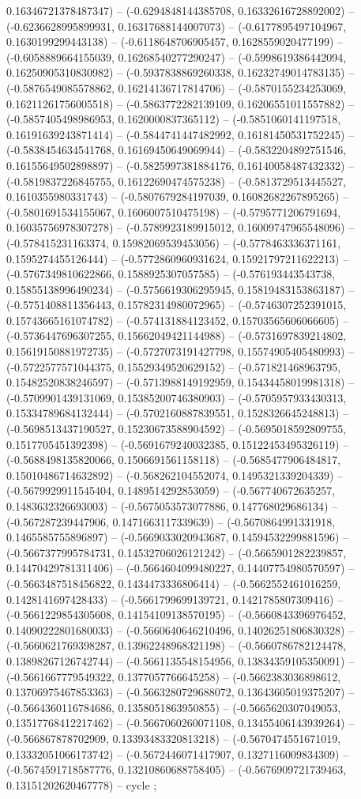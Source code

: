 0.16346721378487347) -- (-0.6294848144385708, 0.16332616728892002) -- (-0.6236628995899931, 0.16317688144007073) -- (-0.6177895497104967, 0.1630199299443138) -- (-0.6118648706905457, 0.1628559020477199) -- (-0.6058889664155039, 0.16268540277290247) -- (-0.5998619386442094, 0.16250905310830982) -- (-0.5937838869260338, 0.16232749014783135) -- (-0.5876549085578862, 0.16214136717814706) -- (-0.5870155234253069, 0.16211261756005518) -- (-0.5863772282139109, 0.16206551011557882) -- (-0.5857405498986953, 0.1620000837365112) -- (-0.5851060141197518, 0.16191639243871414) -- (-0.5844741447482992, 0.16181450531752245) -- (-0.5838454634541768, 0.16169450649069944) -- (-0.5832204892751546, 0.16155649502898897) -- (-0.5825997381884176, 0.16140058487432332) -- (-0.5819837226845755, 0.16122690474575238) -- (-0.5813729513445527, 0.1610355980331743) -- (-0.5807679284197039, 0.16082682267895265) -- (-0.5801691534155067, 0.1606007510475198) -- (-0.5795771206791694, 0.16035756978307278) -- (-0.5789923189915012, 0.16009747965548096) -- (-0.578415231163374, 0.15982069539453056) -- (-0.5778463336371161, 0.1595274455126444) -- (-0.5772860960931624, 0.15921797211622213) -- (-0.5767349810622866, 0.1588925307057585) -- (-0.576193443543738, 0.15855138996490234) -- (-0.5756619306295945, 0.15819483153863187) -- (-0.5751408811356443, 0.15782314980072965) -- (-0.5746307252391015, 0.15743665161074782) -- (-0.574131884123452, 0.15703565606066605) -- (-0.5736447696307255, 0.15662049421144988) -- (-0.5731697839214802, 0.15619150881972735) -- (-0.5727073191427798, 0.15574905405480993) -- (-0.5722577571044375, 0.15529349520629152) -- (-0.571821468963795, 0.15482520838246597) -- (-0.5713988149192959, 0.15434458019981318) -- (-0.5709901439131069, 0.15385200746380903) -- (-0.5705957933430313, 0.15334789684132444) -- (-0.5702160887839551, 0.1528326645248813) -- (-0.5698513437190527, 0.15230673588904592) -- (-0.5695018592809755, 0.1517705451392398) -- (-0.5691679240032385, 0.15122453495326119) -- (-0.5688498135820066, 0.1506691561158118) -- (-0.5685477906484817, 0.15010486714632892) -- (-0.568262104552074, 0.1495321339204339) -- (-0.5679929911545404, 0.1489514292853059) -- (-0.567740672635257, 0.1483632326693003) -- (-0.5675053573077886, 0.147768029686134) -- (-0.567287239447906, 0.1471663117339639) -- (-0.5670864991331918, 0.1465585755896897) -- (-0.5669033020943687, 0.14594532299881596) -- (-0.5667377995784731, 0.14532706026121242) -- (-0.5665901282239857, 0.14470429781311406) -- (-0.5664604099480227, 0.14407754980570597) -- (-0.5663487518456822, 0.1434473336806414) -- (-0.5662552461016259, 0.1428141697428433) -- (-0.5661799699139721, 0.1421785807309416) -- (-0.5661229854305608, 0.14154109138570195) -- (-0.5660843396976452, 0.14090222801680033) -- (-0.5660640646210496, 0.14026251806830328) -- (-0.5660621769398287, 0.13962248968321198) -- (-0.5660786782124478, 0.13898267126742744) -- (-0.5661135548154956, 0.13834359105350091) -- (-0.5661667779549322, 0.1377057766645258) -- (-0.5662383036898612, 0.13706975467853363) -- (-0.5663280729688072, 0.13643605019375207) -- (-0.5664360116784686, 0.1358051863950855) -- (-0.5665620307049053, 0.13517768412217462) -- (-0.5667060260071108, 0.13455406143939264) -- (-0.566867878702909, 0.13393483320813218) -- (-0.5670474551671019, 0.13332051066173742) -- (-0.5672446071417907, 0.1327116009834309) -- (-0.5674591718587776, 0.13210860688758405) -- (-0.5676909721739463, 0.13151202620467778) -- cycle
;